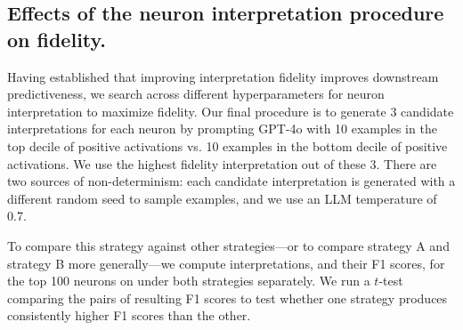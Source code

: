 \subsection{Effects of the neuron interpretation procedure on fidelity.} 
\label{sec:interp_fidelity}

Having established that improving interpretation fidelity improves downstream predictiveness, we search across different hyperparameters for neuron interpretation to maximize fidelity. 
Our final procedure is to generate 3 candidate interpretations for each neuron by prompting GPT-4o with 10 examples in the top decile of positive activations vs. 10 examples in the bottom decile of positive activations. 
We use the highest fidelity interpretation out of these 3.
There are two sources of non-determinism: each candidate interpretation is generated with a different random seed to sample examples, and we use an LLM temperature of 0.7.

To compare this strategy against other strategies—or to compare strategy A and strategy B more generally—we compute interpretations, and their F1 scores, for the top 100 neurons on \yelp under both strategies separately.
We run a $t$-test comparing the pairs of resulting F1 scores to test whether one strategy produces consistently higher F1 scores than the other.

